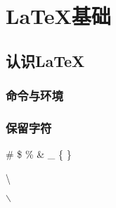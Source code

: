 \section{\LaTeX{}基础}
    \subsection{认识\LaTeX}
        \subsubsection{命令与环境}
        \subsubsection{保留字符}
            \# 
            \$ 
            \% 
            \& 
            \_ 
            \{ 
            \} 

            \textbackslash

            \textrm{}

            {\rmfamily {}}

            $\backslash$

